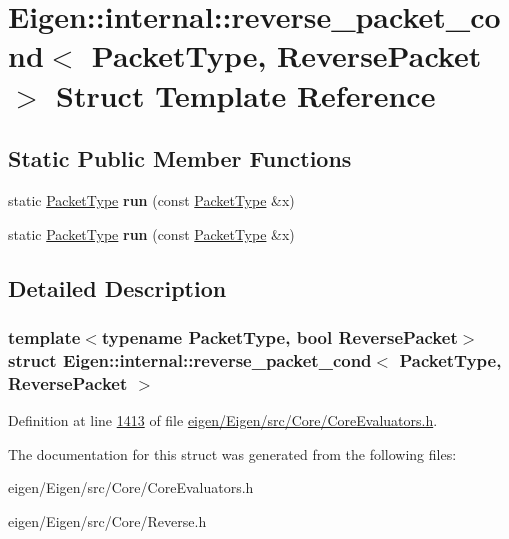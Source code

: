 \hypertarget{struct_eigen_1_1internal_1_1reverse__packet__cond}{}\section{Eigen\+:\+:internal\+:\+:reverse\+\_\+packet\+\_\+cond$<$ Packet\+Type, Reverse\+Packet $>$ Struct Template Reference}
\label{struct_eigen_1_1internal_1_1reverse__packet__cond}
\subsection*{Static Public Member Functions}
\begin{DoxyCompactItemize}
\item 
\mbox{\label{struct_eigen_1_1internal_1_1reverse__packet__cond_a437e133d7ec9a49867b7b11030c9ca6c}} 
static \hyperlink{struct_eigen_1_1_packet_type}{Packet\+Type} {\bfseries run} (const \hyperlink{struct_eigen_1_1_packet_type}{Packet\+Type} \&x)
\item 
\mbox{\label{struct_eigen_1_1internal_1_1reverse__packet__cond_a437e133d7ec9a49867b7b11030c9ca6c}} 
static \hyperlink{struct_eigen_1_1_packet_type}{Packet\+Type} {\bfseries run} (const \hyperlink{struct_eigen_1_1_packet_type}{Packet\+Type} \&x)
\end{DoxyCompactItemize}


\subsection{Detailed Description}
\subsubsection*{template$<$typename Packet\+Type, bool Reverse\+Packet$>$\newline
struct Eigen\+::internal\+::reverse\+\_\+packet\+\_\+cond$<$ Packet\+Type, Reverse\+Packet $>$}



Definition at line \hyperlink{eigen_2_eigen_2src_2_core_2_core_evaluators_8h_source_l01413}{1413} of file \hyperlink{eigen_2_eigen_2src_2_core_2_core_evaluators_8h_source}{eigen/\+Eigen/src/\+Core/\+Core\+Evaluators.\+h}.



The documentation for this struct was generated from the following files\+:\begin{DoxyCompactItemize}
\item 
eigen/\+Eigen/src/\+Core/\+Core\+Evaluators.\+h\item 
eigen/\+Eigen/src/\+Core/\+Reverse.\+h\end{DoxyCompactItemize}
